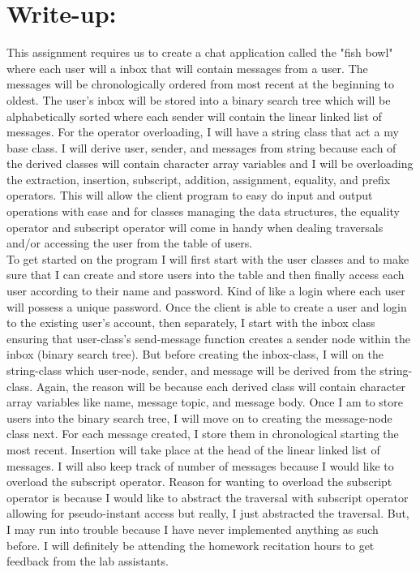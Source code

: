 \documentclass[11pt, a4paper]{article}
\begin{document}
\section*{Write-up:}
This assignment requires us to create a chat application called the "fish bowl" where each user will a inbox that will contain messages from a user. The messages will be chronologically ordered from most recent at the beginning to oldest. The user's inbox will be stored into a binary search tree which will be alphabetically sorted where each sender will contain the linear linked list of messages. For the operator overloading, I will have a string class that act a my base class. I will derive user, sender, and messages from string because each of the derived classes will contain character array variables and I will be overloading the extraction, insertion, subscript, addition, assignment, equality, and prefix operators. This will allow the client program to easy do input and output operations with ease and for classes managing the data structures, the equality operator and subscript operator will come in handy when dealing traversals and/or accessing the user from the table of users.\\
\indent To get started on the program I will first start with the user classes and to make sure that I can create and store users into the table and then finally access each user according to their name and password. Kind of like a login where each user will possess a unique password. Once the client is able to create a user and login to the existing user's account, then separately, I start with the inbox class ensuring that user-class's send-message function creates a sender node within the inbox (binary search tree). But before creating the inbox-class, I will on the string-class which user-node, sender, and message will be derived from the string-class. Again, the reason will be because each derived class will contain character array variables like name, message topic, and message body. Once I am to store users into the binary search tree, I will move on to creating the message-node class next. For each message created, I store them in chronological starting the most recent. Insertion will take place at the head of the linear linked list of messages. I will also keep track of number of messages because I would like to overload the subscript operator. Reason for wanting to overload the subscript operator is because I would like to abstract the traversal with subscript operator allowing for pseudo-instant access but really, I just abstracted the traversal. But, I may run into trouble because I have never implemented anything as such before. I will definitely be attending the homework recitation hours to get feedback from the lab assistants. \\
\end{document}
